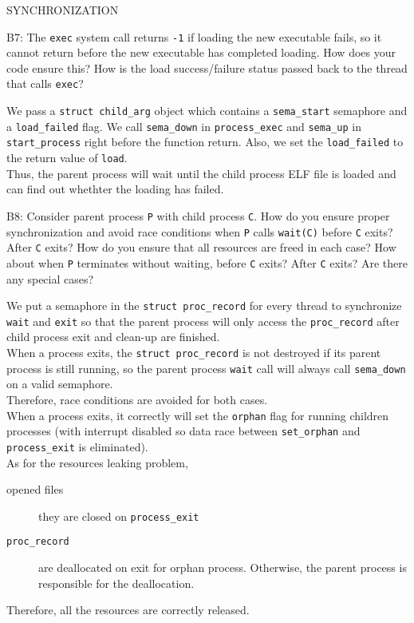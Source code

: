 \begin{aspect}{SYNCHRONIZATION}
	\begin{qc}
		B7: The \lstinline{exec} system call returns \lstinline{-1}
		if loading the new executable fails, so it cannot return before the new executable has completed loading.
		How does your code ensure this?
		How is the load success/failure status passed back to the thread that calls \lstinline{exec}?
	\end{qc}
	We pass a \lstinline{struct child_arg} object which contains a \lstinline{sema_start} semaphore and a \lstinline{load_failed} flag.
	We call \lstinline{sema_down} in \lstinline{process_exec} and \lstinline{sema_up} in \lstinline{start_process} right before the function return.
	Also, we set the \lstinline{load_failed} to the return value of \lstinline{load}.\\
	Thus, the parent process will wait until the child process ELF file is loaded and can find out whethter the loading has failed.

	\begin{qc}
		B8: Consider parent process \lstinline{P} with child process \lstinline{C}.
		How do you ensure proper synchronization and avoid race conditions
		when \lstinline{P} calls \lstinline{wait(C)} before \lstinline{C} exits? After \lstinline{C} exits?
		How do you ensure that all resources are freed in each case?
		How about when \lstinline{P} terminates without waiting, before \lstinline{C} exits? After \lstinline{C} exits?
		Are there any special cases?
	\end{qc}
	We put a semaphore in the \lstinline{struct proc_record} for every thread to synchronize \lstinline{wait} and \lstinline{exit}
	so that the parent process will only access the \lstinline{proc_record} after child process exit and clean-up are finished.\\
	When a process exits, the \lstinline{struct proc_record} is not destroyed if its parent process is still running,
	so the parent process \lstinline{wait} call will always call \lstinline{sema_down} on a valid semaphore.\\
	Therefore, race conditions are avoided for both cases.\\

	When a process exits, it correctly will set the \lstinline{orphan} flag for running children processes
	(with interrupt disabled so data race between \lstinline{set_orphan} and \lstinline{process_exit} is eliminated).\\

	As for the resources leaking problem,
	\begin{description}
		\item[opened files] they are closed on \lstinline{process_exit}
		\item[\lstinline{proc_record}] are deallocated on exit for orphan process. Otherwise, the parent process is responsible for the deallocation.
	\end{description}
	Therefore, all the resources are correctly released.
\end{aspect}

